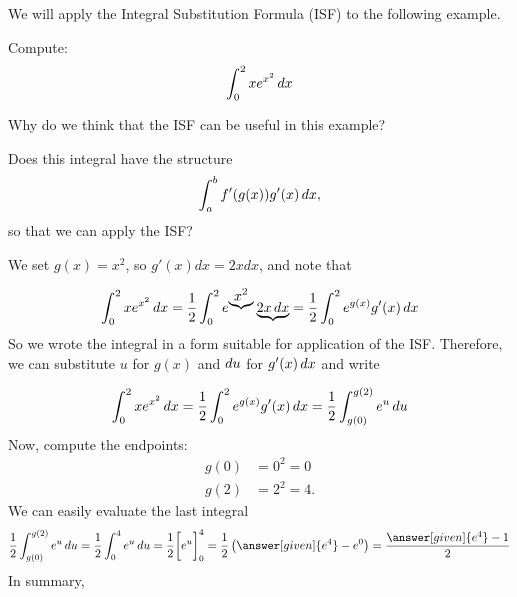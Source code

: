 \documentclass{ximera}
\begin{document}
We will apply the Integral Substitution Formula (ISF)  to the following example.

\begin{example}
Compute:
\[
\int_0^2 x e^{x^2}\mathop{}\!d x
\]
\begin{explanation}
Why do we think that the ISF can be useful in this example?

Does this integral have the structure
\[
\int_a^b f'(g(x)) g'(x) \mathop{}\!d x ,
\]
so that we can apply the ISF?

We set $g(x) =x^2$, so $g'(x)dx =2xdx$, and note that

\[
\int_0^2 x e^{x^2}\mathop{}\!d x
=\frac{1}{2}\int_0^{2} e^{\underbrace{x^2}}\underbrace{2x\mathop{}\!d x}=\frac{1}{2}\int_0^{2} e^{g(x)}g'(x)\mathop{}\!d x
\]
So we wrote the integral in a form suitable for application of the ISF. Therefore, we can substitute $u$ for $g(x)$ and $\mathop{}\!d u$ for $g'(x)\mathop{}\!d x$ and write

\[
\int_0^2 x e^{x^2}\mathop{}\!d x=\frac{1}{2}\int_0^{2} e^{g(x)}g'(x)\mathop{}\!d x=\frac{1}{2}\int_{g(0)}^{g(2)} e^{u}\mathop{}\!d u
\]
Now, compute the endpoints:
\begin{align*}
g(0) &= 0^2 = 0  \\
g(2) &=2^2 = 4.
\end{align*}
We can easily evaluate the last integral
\[
\frac{1}{2}\int_{g(0)}^{g(2)} e^{u}\d u=
\frac{1}{2}\int_{0}^{4} e^{u}\d u=\frac{1}{2}\eval{e^u}_0^4=\frac{1}{2}\left(\answer[given]{e^4}-e^0\right)=\frac{\answer[given]{e^4}-1}{2}
\]
In summary,


\end{explanation}
\end{example}
\end{document}
